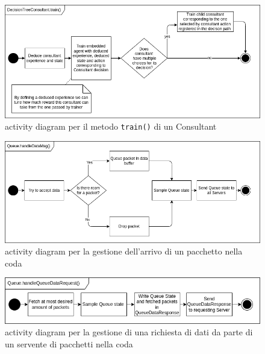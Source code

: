 \documentclass[conference]{IEEEtran}
\newcommand{\code}[1]{\texttt{#1}}
\begin{document}
\begin{figure}
    \centering
    \includegraphics[width=\textwidth]{figs/decisions_train_activity_diagram.drawio.png}
    \caption{activity diagram per il metodo \code{train()} di un Consultant}
    \label{fig:decisions_train_activity_diagram}
\end{figure}
\begin{figure}
    \centering
    \includegraphics[width=\textwidth]{figs/queue_handleDataMsg_activity_diagram.drawio.png}
    \caption{activity diagram per la gestione dell'arrivo di un pacchetto nella coda}
    \label{fig:queue_handleDataMsg_activity_diagram}
\end{figure}
\begin{figure}
    \centering
    \includegraphics[width=\textwidth]{figs/queue_handleQueueDataRequest_activity_diagram.drawio.png}
    \caption{activity diagram per la gestione di una richiesta di dati da parte di un servente di pacchetti nella coda}
    \label{fig:queue_handleQueueDataRequest_activity_diagram}
\end{figure}
\end{document}
